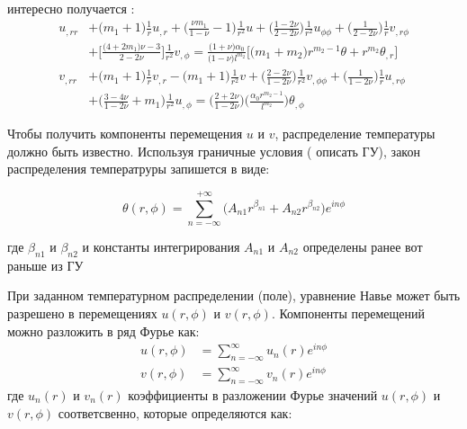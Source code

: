 {\color{red} интересно получается :
}
\begin{equation}
	\label{eq:ch2:equation5}
	\begin{split}
		u_{,rr} &+ \big ( m_1+1\big ) \frac{1}{r} u_{,r} + \big ( \frac{\nu m_1}{1-\nu} -1 \big ) \frac{1}{r^2} u + \big ( \frac{1-2\nu}{2-2\nu} \big) \frac{1}{r^2} u_{\phi \phi} + \big ( \frac{1}{2-2\nu}\big ) \frac{1}{r} v_{,r \phi} \\
		&+ \big [ \frac{\big ( 4+2 m_1\big ) \nu -3 }{2-2\nu} \big ] \frac{1}{r^2} v_{, \phi} = \frac{\big ( 1+\nu\big ) \alpha_0 }{\big (1-\nu \big ) l^{m_2}} \Big [ \big (m_1 + m_2 \big ) r^{m_2 -1} \theta + r^{m_2} \theta_{,r}\Big] \\
		v_{,rr} &+ \big (m_1 +1 \big ) \frac{1}{r} v_{,r} - \big (m_1 + 1 \big ) \frac{1}{r^2} v + \big ( \frac{2-2\nu }{1-2\nu } \big ) \frac{1}{r^2} v_{,\phi \phi} + \big ( \frac{1}{1-2\nu} \big ) \frac{1}{r} u_{,r \phi} \\
		&+ \big ( \frac{3-4\nu}{1-2\nu} + m_1\big ) \frac{1}{r^2} u_{, \phi} = \big (\frac{2+2\nu}{1-2\nu} \big ) \big (\frac{\alpha_0 r^{m_2 -1}}{l^{m_2}} \big ) \theta_{,\phi}
	\end{split}
\end{equation}



Чтобы получить компоненты перемещения \(u\) и \(v\), распределение температуры должно быть известно. Используя граничные условия ({\color{red} описать ГУ}), закон распределения температруры запишется в виде:

\begin{equation}
	\label{eq:ch2:equation6}
	\theta(r, \phi) = \sum_{n=-\infty}^{+\infty} \big (A_{n1} r^{\beta_{n1}} + A_{n2} r^{\beta_{n2}} \big ) e^{in \phi}
\end{equation}

где \(\beta_{n1}\) и \(\beta_{n2}\) и константы интегрирования \(A_{n1}\) и \(A_{n2}\) определены ранее {\color{red} вот раньше из ГУ} 

При заданном температурном распределении (поле), уравнение Навье может быть разрешено в перемещениях \(u(r, \phi) \) и \(v(r, \phi) \). Компоненты перемещений можно разложить в ряд Фурье как:
\begin{equation}
\label{eq:ch2:equation7}
\begin{split}
	u(r, \phi) &= \sum_{n=-\infty}^{\infty} u_n(r) e^{in\phi}\\
	v(r, \phi) &= \sum_{n=-\infty}^{\infty} v_n(r) e^{in\phi}
\end{split}
\end{equation}
где \(u_n(r)\) и \(v_n(r)\) коэффициенты в разложении Фурье значений \(u(r, \phi)\) и \(v(r, \phi)\) соответсвенно, которые определяются как:

